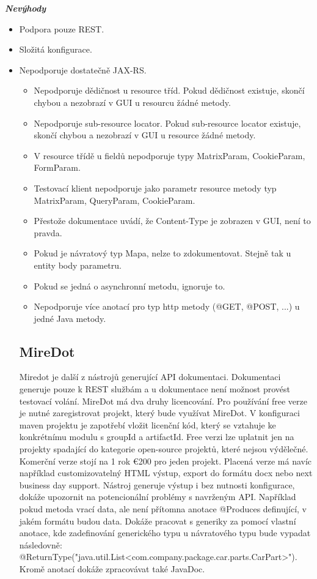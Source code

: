 \documentclass[11pt,twoside,a4paper]{book}
\begin{document}
\textbf{\textit{Nevýhody}}

\begin{itemize}
  \item Podpora pouze REST.
  \item Složitá konfigurace.
  \item Nepodporuje dostatečně JAX-RS.
  \begin{itemize}
    \item Nepodporuje dědičnost u resource tříd. Pokud dědičnost existuje, skončí chybou a
nezobrazí v GUI u resourcu žádné metody.
    \item Nepodporuje sub-resource locator. Pokud sub-resource locator existuje, skončí
chybou a nezobrazí v GUI u resource žádné metody.
    \item V resource třídě u fieldů nepodporuje typy MatrixParam, CookieParam,
FormParam.
    \item Testovací klient nepodporuje jako parametr resource metody typ
MatrixParam, QueryParam, CookieParam.
    \item Přestože dokumentace uvádí, že Content-Type je zobrazen v GUI, není to
pravda.
    \item Pokud je návratový typ Mapa, nelze to zdokumentovat. Stejně tak u
entity body parametru.
    \item Pokud se jedná o asynchronní metodu, ignoruje to.
    \item Nepodporuje více anotací pro typ http metody (@GET, @POST, ...) u
jedné Java metody.
\end{itemize}

\subsection{MireDot}

Miredot je další z nástrojů generující API dokumentaci. Dokumentaci generuje
pouze k REST službám a u dokumentace není možnost provést testovací volání. 
MireDot má dva druhy licencování. Pro používání free verze je nutné zaregistrovat 
projekt, který bude využívat MireDot. V konfiguraci maven projektu je zapotřebí 
vložit licenční kód, který se vztahuje ke konkrétnímu modulu s groupId a artifactId. 
Free verzi lze uplatnit jen na projekty spadající do kategorie open-source projektů, 
které nejsou výdělečné. Komerční verze stojí na 1 rok €200 pro jeden projekt. 
Placená verze má navíc například customizovatelný HTML výstup, export do formátu 
docx nebo next business day support. Nástroj generuje výstup i bez nutnosti 
konfigurace, dokáže upozornit na potencionální problémy s navrženým API. Například 
pokud metoda vrací data, ale není přítomna anotace @Produces definující, v jakém 
formátu budou data. Dokáže pracovat s generiky za pomocí vlastní anotace, kde 
zadefinování generického typu u návratového typu bude vypadat následovně: 
@ReturnType("java.util.List<com.company.package.car.parts.CarPart>"). Kromě 
anotací dokáže zpracovávat také JavaDoc.


\end{itemize}
\end{document}
